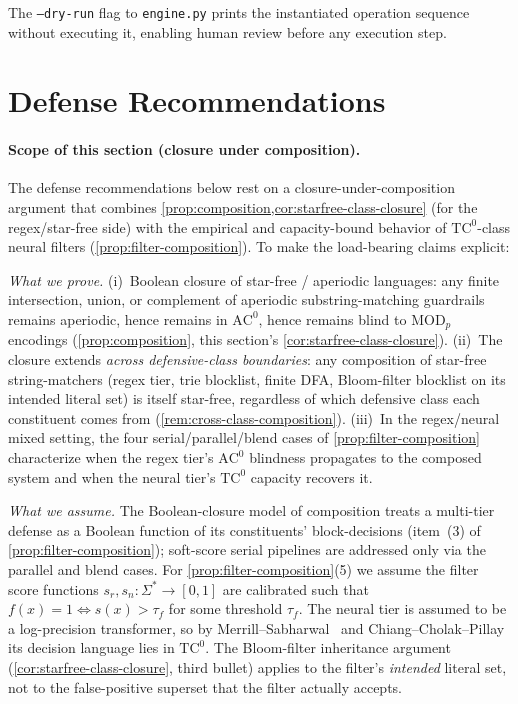 \documentclass[letterpaper,twocolumn,10pt]{article}
\theoremstyle{definition}
\theoremstyle{remark}
\begin{document}
The \texttt{--dry-run} flag to \texttt{engine.py} prints the instantiated operation
sequence without executing it, enabling human review before any execution step.

\section{Defense Recommendations}\label{sec:discussion}

\paragraph{Scope of this section (closure under composition).}
The defense recommendations below rest on a closure-under-composition
argument that combines \cref{prop:composition,cor:starfree-class-closure}
(for the regex/star-free side) with the empirical and capacity-bound
behavior of $\mathrm{TC}^0$-class neural filters
(\cref{prop:filter-composition}). To make the load-bearing claims
explicit:

\emph{What we prove.} (i)~Boolean closure of star-free / aperiodic
languages: any finite intersection, union, or complement of aperiodic
substring-matching guardrails remains aperiodic, hence remains in
$\mathrm{AC}^0$, hence remains blind to $\mathrm{MOD}_p$ encodings
(\cref{prop:composition}, this section's
\cref{cor:starfree-class-closure}). (ii)~The closure extends \emph{across
defensive-class boundaries}: any composition of star-free string-matchers
(regex tier, trie blocklist, finite DFA, Bloom-filter blocklist on its
intended literal set) is itself star-free, regardless of which defensive
class each constituent comes from
(\cref{rem:cross-class-composition}). (iii)~In the regex/neural mixed
setting, the four serial/parallel/blend cases of
\cref{prop:filter-composition} characterize when the regex tier's
$\mathrm{AC}^0$ blindness propagates to the composed system and when the
neural tier's $\mathrm{TC}^0$ capacity recovers it.

\emph{What we assume.} The Boolean-closure model of composition treats a
multi-tier defense as a Boolean function of its constituents'
block-decisions (item~(3) of \cref{prop:filter-composition}); soft-score
serial pipelines are addressed only via the parallel and blend cases.
For \cref{prop:filter-composition}(5) we assume the filter score functions
$s_r, s_n\colon \Sigma^* \to [0,1]$ are calibrated such that
$f(x) = 1 \iff s(x) > \tau_f$ for some threshold $\tau_f$. The neural
tier is assumed to be a log-precision transformer, so by
Merrill--Sabharwal~\cite{merrill2023saturated} and
Chiang--Cholak--Pillay~\cite{chiang2023tighter} its decision language
lies in $\mathrm{TC}^0$. The Bloom-filter inheritance argument
(\cref{cor:starfree-class-closure}, third bullet) applies to the filter's
\emph{intended} literal set, not to the false-positive superset that the
filter actually accepts.
\end{document}
